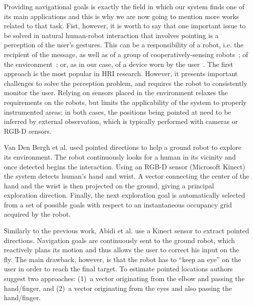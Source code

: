 Providing navigational goals is exactly the field in which our system finds one of its main applications and this is why we are now going to mention more works related to that task. Fist, however, it is worth to say that one important issue to be solved in natural human-robot interaction that involves pointing is a perception of the user's gestures. This can be a responsibility of a robot, i.e. the recipient of the message, as well as of a group of cooperatively-sensing robots~\cite{Giusti2012,Pourmehr2013}; of the environment~\cite{zivkovic2008toward}; or, as in our case, of a device worn by the user~\cite{Sugiyama2013,Wolf2013,Gromov2016}. The first approach is the most popular in HRI research. However, it presents important challenges to solve the perception problem, and requires the robot to consistently monitor the user. Relying on sensors placed in the environment relaxes the requirements on the robots, but limits the applicability of the system to properly instrumented areas; in both cases, the positions being pointed at need to be inferred by external observation, which is typically performed with cameras or RGB-D sensors.

Van Den Bergh et al. \cite{VanDenBergh2011} used pointed directions to help a ground robot to explore its environment. The robot continuously looks for a human in its vicinity and once detected begins the interaction. Using an RGB-D sensor (Microsoft Kinect) the system detects human's hand and wrist. A vector connecting the center of the hand and the wrist is then projected on the ground, giving a principal exploration direction. Finally, the next exploration goal is automatically selected from a set of possible goals with respect to an instantaneous occupancy grid acquired by the robot. 

Similarly to the previous work, Abidi et al. \cite{Abidi2013} use a Kinect sensor to extract pointed directions. Navigation goals are continuously sent to the ground robot, which reactively plans its motion and thus allows the user to correct his input on the fly. The main drawback, however, is that the robot has to ``keep an eye'' on the user in order to reach the final target. To estimate pointed locations authors suggest two approaches: (1)~a vector originating from the elbow and passing the hand/finger, and (2)~a vector originating from the eyes and also passing the hand/finger.


